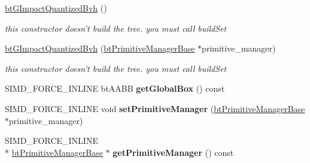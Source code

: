 \begin{DoxyCompactItemize}
\item 
\hypertarget{classbt_g_impact_quantized_bvh_a3adf6c64b003214564e045326e4fabb7}{\hyperlink{classbt_g_impact_quantized_bvh_a3adf6c64b003214564e045326e4fabb7}{bt\+G\+Impact\+Quantized\+Bvh} ()}\label{classbt_g_impact_quantized_bvh_a3adf6c64b003214564e045326e4fabb7}

\begin{DoxyCompactList}\small\item\em this constructor doesn't build the tree. you must call build\+Set \end{DoxyCompactList}\item 
\hypertarget{classbt_g_impact_quantized_bvh_a567d06bf430c21fe4887f1b996bb6ba4}{\hyperlink{classbt_g_impact_quantized_bvh_a567d06bf430c21fe4887f1b996bb6ba4}{bt\+G\+Impact\+Quantized\+Bvh} (\hyperlink{classbt_primitive_manager_base}{bt\+Primitive\+Manager\+Base} $\ast$primitive\+\_\+manager)}\label{classbt_g_impact_quantized_bvh_a567d06bf430c21fe4887f1b996bb6ba4}

\begin{DoxyCompactList}\small\item\em this constructor doesn't build the tree. you must call build\+Set \end{DoxyCompactList}\item 
\hypertarget{classbt_g_impact_quantized_bvh_af2309fdcd1f0cb289a64c64864c29459}{S\+I\+M\+D\+\_\+\+F\+O\+R\+C\+E\+\_\+\+I\+N\+L\+I\+N\+E bt\+A\+A\+B\+B {\bfseries get\+Global\+Box} () const }\label{classbt_g_impact_quantized_bvh_af2309fdcd1f0cb289a64c64864c29459}

\item 
\hypertarget{classbt_g_impact_quantized_bvh_ab4e8e255305f61908ca119fb751bf22c}{S\+I\+M\+D\+\_\+\+F\+O\+R\+C\+E\+\_\+\+I\+N\+L\+I\+N\+E void {\bfseries set\+Primitive\+Manager} (\hyperlink{classbt_primitive_manager_base}{bt\+Primitive\+Manager\+Base} $\ast$primitive\+\_\+manager)}\label{classbt_g_impact_quantized_bvh_ab4e8e255305f61908ca119fb751bf22c}

\item 
\hypertarget{classbt_g_impact_quantized_bvh_a8954b68cdc557ffab6c4c0361cea109a}{S\+I\+M\+D\+\_\+\+F\+O\+R\+C\+E\+\_\+\+I\+N\+L\+I\+N\+E \\*
\hyperlink{classbt_primitive_manager_base}{bt\+Primitive\+Manager\+Base} $\ast$ {\bfseries get\+Primitive\+Manager} () const }\label{classbt_g_impact_quantized_bvh_a8954b68cdc557ffab6c4c0361cea109a}

\end{DoxyCompactItemize}
